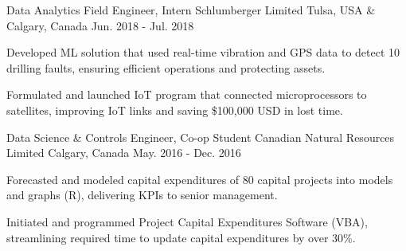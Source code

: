 \begin{cventries}
  \cventry
    {Data Analytics Field Engineer, Intern} %
    {Schlumberger Limited} %
    {Tulsa, USA \& Calgary, Canada} %
    {Jun. 2018 - Jul. 2018} %
    {
      \begin{cvitems} %
        \item {Developed ML solution that used real-time vibration and GPS data to detect 10 drilling faults, ensuring efficient operations and protecting assets.}
        \item {Formulated and launched IoT program that connected microprocessors to satellites, improving IoT links and saving \$100,000 USD in lost time.}
      \end{cvitems}
    }

  \cventry
    {Data Science \& Controls Engineer, Co-op Student} %
    {Canadian Natural Resources Limited} %
    {Calgary, Canada} %
    {May. 2016 - Dec. 2016} %
    {
      \begin{cvitems} %
        \item {Forecasted and modeled capital expenditures of 80 capital projects into models and graphs (R), delivering KPIs to senior management.}
        \item {Initiated and programmed Project Capital Expenditures Software (VBA), streamlining required time to update capital expenditures by over 30\%.}
      \end{cvitems}
    }



\end{cventries}

